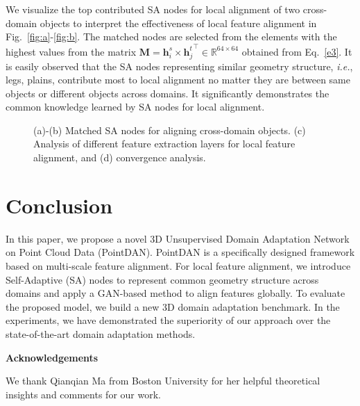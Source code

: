 \documentclass{article}
\newcommand*\ie{\textit{i.e.}}
\begin{document}
We visualize the top contributed SA nodes for local alignment of two cross-domain objects to interpret the effectiveness of local feature alignment in Fig.~\ref{fig:a}-\ref{fig:b}. The matched nodes are selected from the elements with the highest values from the matrix $\mathbf{M} = \mathbf{h}_i^{s} \times {\mathbf{h}_j^{t}}^{\top} \in \mathbb{R}^{64\times64}$ obtained from Eq.~\ref{e3}. It is easily observed that the SA nodes representing similar geometry structure, \ie, legs, plains, contribute most to local alignment no matter they are between same objects or different objects across domains. It significantly demonstrates the common knowledge learned by SA nodes for local alignment.
\begin{figure}[t!]
\centering
{}

\caption{(a)-(b) Matched SA nodes for aligning cross-domain objects. (c) Analysis of different feature extraction layers for local feature alignment, and (d) convergence analysis.}\label{f3} 

\end{figure}




\section{Conclusion}
In this paper, we propose a novel 3D Unsupervised Domain Adaptation Network on Point Cloud Data (PointDAN). PointDAN is a specifically designed framework based on multi-scale feature alignment. For local feature alignment, we introduce Self-Adaptive (SA) nodes to represent common geometry structure across domains and apply a GAN-based method to align features globally. To evaluate the proposed model, we build a new 3D domain adaptation benchmark. In the experiments, we have demonstrated the superiority of our approach over the state-of-the-art domain adaptation methods.

\textbf{Acknowledgements}

We thank Qianqian Ma from Boston University for her helpful theoretical insights and comments for our work.



\end{document}
